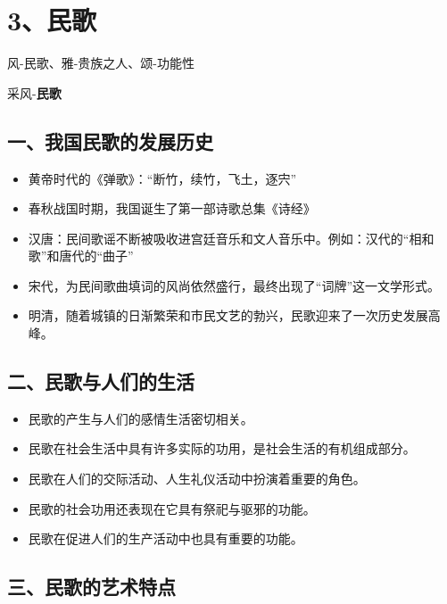 \documentclass[
]{article}
\providecommand{\tightlist}{%
  \setlength{\itemsep}{0pt}\setlength{\parskip}{0pt}}
\begin{document}
\section{3、民歌}\label{ux6c11ux6b4c}

风-民歌、雅-贵族之人、颂-功能性

采风-\textbf{民歌}


\subsection{一、我国民歌的发展历史}\label{ux4e00ux6211ux56fdux6c11ux6b4cux7684ux53d1ux5c55ux5386ux53f2}

\begin{itemize}
\tightlist
\item
  黄帝时代的《弹歌》：``断竹，续竹，飞土，逐宍''
\item
  春秋战国时期，我国诞生了第一部诗歌总集《诗经》
\item
  汉唐：民间歌谣不断被吸收进宫廷音乐和文人音乐中。例如：汉代的``相和歌''和唐代的``曲子''
\item
  宋代，为民间歌曲填词的风尚依然盛行，最终出现了``词牌''这一文学形式。
\item
  明清，随着城镇的日渐繁荣和市民文艺的勃兴，民歌迎来了一次历史发展高峰。
\end{itemize}

\subsection{二、民歌与人们的生活}\label{ux4e8cux6c11ux6b4cux4e0eux4ebaux4eecux7684ux751fux6d3b}

\begin{itemize}
\tightlist
\item
  民歌的产生与人们的感情生活密切相关。
\item
  民歌在社会生活中具有许多实际的功用，是社会生活的有机组成部分。
\item
  民歌在人们的交际活动、人生礼仪活动中扮演着重要的角色。
\item
  民歌的社会功用还表现在它具有祭祀与驱邪的功能。
\item
  民歌在促进人们的生产活动中也具有重要的功能。
\end{itemize}

\subsection{三、民歌的艺术特点}\label{ux4e09ux6c11ux6b4cux7684ux827aux672fux7279ux70b9}
\end{document}
